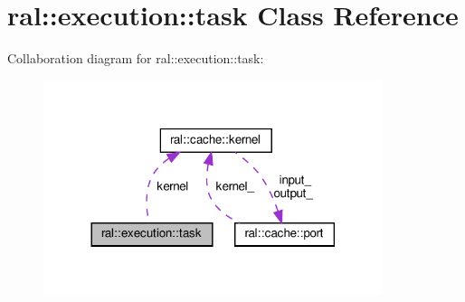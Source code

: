 \hypertarget{classral_1_1execution_1_1task}{}\section{ral\+:\+:execution\+:\+:task Class Reference}
\label{classral_1_1execution_1_1task}


Collaboration diagram for ral\+:\+:execution\+:\+:task\+:\nopagebreak
\begin{figure}[H]
\begin{center}
\leavevmode
\includegraphics[width=281pt]{classral_1_1execution_1_1task__coll__graph}
\end{center}
\end{figure}
